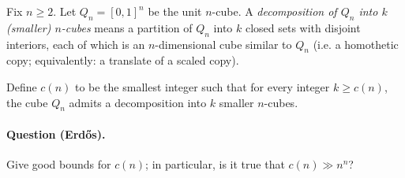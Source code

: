 \begin{definition}
Fix $n\ge 2$.
Let $Q_n=[0,1]^n$ be the unit $n$-cube.
A \emph{decomposition of $Q_n$ into $k$ (smaller) $n$-cubes} means a partition of $Q_n$ into $k$ closed sets with disjoint interiors, each of which is an $n$-dimensional cube similar to $Q_n$ (i.e. a homothetic copy; equivalently: a translate of a scaled copy).

Define $c(n)$ to be the smallest integer such that for every integer $k\ge c(n)$, the cube $Q_n$ admits a decomposition into $k$ smaller $n$-cubes.
\end{definition}

\paragraph{Question (Erd\H{o}s).}
Give good bounds for $c(n)$; in particular, is it true that $c(n)\gg n^n$?
